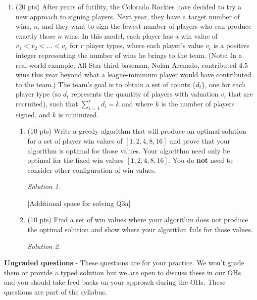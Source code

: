 \documentclass[12pt]{article}
\theoremstyle{remark}
\newtheorem*{solution}{Solution}
\begin{document}
\begin{enumerate}
\item (20 pts) After years of futility, the Colorado Rockies have decided to try a new approach to signing players. Next year, they have a target number of wins, $n$, and they want to sign the fewest number of players who can produce exactly those $n$ wins. In this model, each player has a win value of $v_{1}<v_{2}<\dots<v_{r}$ for $r$ player types, where each player's value $v_{i}$ is a positive integer representing the number of wins he brings to the team. (Note: In a real-world example, All-Star third baseman, Nolan Arenado, contributed 4.5 wins this year beyond what a league-minimum player would have contributed to the team.) 
The team's goal is to obtain a set of counts $\{d_{i}\}$, one for each player type (so $d_{i}$ represents the quantity of players with valuation $v_{i}$ that are recruited), such that $\sum_{i=1}^{r}d_{i}=k$ and where $k$ is the number of players signed, and $k$ is minimized.
	\begin{enumerate}
	\item  (10 pts) Write a greedy algorithm that will produce an optimal solution for a set of player win values of $[1, 2, 4, 8, 16]$ and prove that your algorithm is optimal for those values. Your algorithm need only be optimal for the fixed win values $[1, 2, 4, 8, 16]$. You do \textbf{not} need to consider other configuration of win values.
	\begin{solution}

    \end{solution}
    \pagebreak

[Additional space for solving Q3a]
\pagebreak

\item (10 pts) Find a set of win values where your algorithm does not produce the optimal solution and show where your algorithm fails for those values. 
\begin{solution}

\end{solution}

    \end{enumerate}

\end{enumerate}

\pagebreak
\textbf{Ungraded questions} - These questions are for your practice. We won't grade them or provide a typed solution but we are open to discuss these in our OHs and you should take feed backs on your approach during the OHs. These questions are part of the syllabus. 
\end{document}
